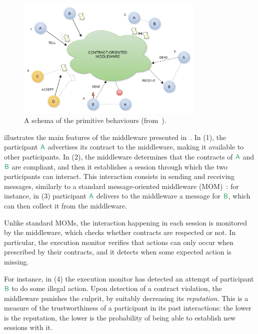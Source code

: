 \begin{figure}[t]
  \centering
  \includegraphics[width=0.8\textwidth]{primitive-schema.png}
  \caption{A schema of the primitive behaviours (from~\cite{CO2}).} 
  \label{fig:primitives}
\end{figure}

 illustrates the main features of the middleware
presented in~\cite{CO2middleware}. %
In (1), the participant $\pmv A$ advertises its contract to the middleware, %
making it available to other participants.
%
In (2), the middleware determines that the contracts of 
$\pmv A$ and $\pmv B$ are compliant,
and then it establishes a session through which
the two participants can interact. %
This interaction consists in sending and receiving messages, 
similarly to a standard message-oriented middleware (MOM)~\cite{Banavar99dc}: %
for instance, in (3) participant $\pmv A$ delivers to the middleware a message for $\pmv B$,
which can then collect it from the middleware.

Unlike standard MOMs, the interaction happening in each session is monitored by the middleware, 
which checks whether contracts are respected or not. 
In particular, the execution monitor verifies that 
actions can only occur when prescribed by their contracts, %
and it detects when some expected action is missing.

For instance, in (4) the execution monitor has detected  
an attempt of participant $\pmv B$ to do some illegal action. %
Upon detection of a contract violation, the middleware 
punishes the culprit, %
by suitably decreasing its \emph{reputation}. 
This is a measure of the trustworthiness of a participant
in its past interactions: the lower is the reputation,
the lower is the probability of being able to establish new sessions with it.



